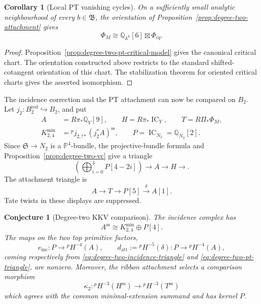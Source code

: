 \documentclass[11pt,reqno]{amsart}
\newtheorem{corollary}[theorem]{Corollary}
\newtheorem{conjecture}[theorem]{Conjecture}
\theoremstyle{definition}
\newcommand{\Q}{\mathbb Q}
\newcommand{\Pp}{\mathbb P}
\newcommand{\IC}{\operatorname{IC}}
\newcommand{\red}{\mathrm{red}}
\begin{document}
\begin{corollary}[Local PT vanishing cycles]
\label{cor:degree-two-local-vanishing-cycles}
On a sufficiently small analytic neighbourhood of every
$b\in\mathfrak B$, the orientation of
Proposition~\ref{prop:degree-two-attachment} gives
\[
 \Phi_M\cong\Q_{\mathbb A^6}[6]\boxtimes\Phi_{cq}.
\]
\end{corollary}

\begin{proof}
Proposition~\ref{prop:degree-two-pt-critical-model} gives the canonical
critical chart.  The orientation constructed above restricts to the
standard shifted-cotangent orientation of this chart.  The stabilization
theorem for oriented critical charts gives the asserted isomorphism.
\end{proof}

The incidence correction and the PT attachment can now be compared on
$B_2$.  Let $j_2:B_2^{\red}\hookrightarrow B_2$, and put
\[
 \begin{split}
 A&=R\pi_*\Q_Y[9],\qquad H=R\pi_*\IC_Y,\qquad
 T=R\Pi_*\Phi_M,\\
 K_{2,4}^{\min}&={}^pj_{2,!*}(j_2^*A)^{\mathrm{ss}},\qquad
 P=\IC_{N_2}=\Q_{N_2}[2].
 \end{split}
\]
Since $\mathfrak S\to N_2$ is a $\Pp^4$-bundle, the projective-bundle
formula and Proposition~\ref{prop:degree-two-vc} give a triangle
\begin{equation}\label{eq:degree-two-incidence-triangle}
 \left(\bigoplus_{i=0}^4P[4-2i]\right)
 \longrightarrow A\longrightarrow H\longrightarrow.
\end{equation}
The attachment triangle is
\begin{equation}\label{eq:degree-two-pt-triangle}
 A\longrightarrow T\longrightarrow P[5]
 \xrightarrow{\delta}A[1].
\end{equation}
Tate twists in these displays are suppressed.

\begin{conjecture}[Degree-two KKV comparison]
\label{conj:degree-two-kkv}
The incidence complex has
\[
 A^{\mathrm{ss}}\cong K_{2,4}^{\min}\oplus P[4].
\]
The maps on the two top primitive factors,
\[
 e_{\mathrm{inc}}:P\longrightarrow{}^pH^{-4}(A),\qquad
 d_{\mathrm{att}}:={}^pH^{-5}(\delta):P\longrightarrow{}^pH^{-4}(A),
\]
coming respectively from
\eqref{eq:degree-two-incidence-triangle} and
\eqref{eq:degree-two-pt-triangle}, are nonzero.
Moreover, the ribbon attachment selects a comparison morphism
\[
 \kappa_2:{}^pH^{-3}(H^{\mathrm{ss}})
 \longrightarrow{}^pH^{-3}(T^{\mathrm{ss}})
\]
which agrees with the common minimal-extension summand and has kernel $P$.
\end{conjecture}
\end{document}

